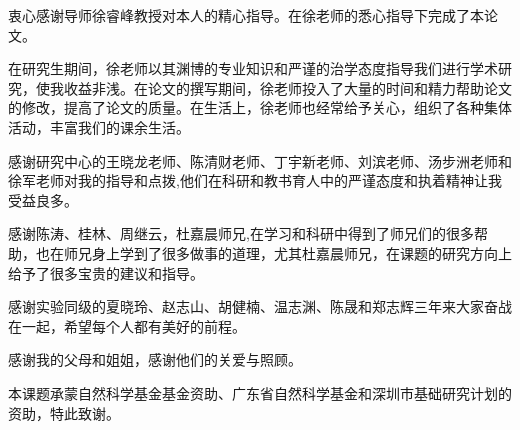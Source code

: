 

衷心感谢导师徐睿峰教授对本人的精心指导。在徐老师的悉心指导下完成了本论文。

在研究生期间，徐老师以其渊博的专业知识和严谨的治学态度指导我们进行学术研究，使我收益非浅。在论文的撰写期间，徐老师投入了大量的时间和精力帮助论文的修改，提高了论文的质量。在生活上，徐老师也经常给予关心，组织了各种集体活动，丰富我们的课余生活。

感谢研究中心的王晓龙老师、陈清财老师、丁宇新老师、刘滨老师、汤步洲老师和徐军老师对我的指导和点拨,他们在科研和教书育人中的严谨态度和执着精神让我受益良多。

感谢陈涛、桂林、周继云，杜嘉晨师兄,在学习和科研中得到了师兄们的很多帮助，也在师兄身上学到了很多做事的道理，尤其杜嘉晨师兄，在课题的研究方向上给予了很多宝贵的建议和指导。

感谢实验同级的夏晓玲、赵志山、胡健楠、温志渊、陈晟和郑志辉三年来大家奋战在一起，希望每个人都有美好的前程。

感谢我的父母和姐姐，感谢他们的关爱与照顾。

本课题承蒙自然科学基金基金资助、广东省自然科学基金和深圳市基础研究计划的资助，特此致谢。
